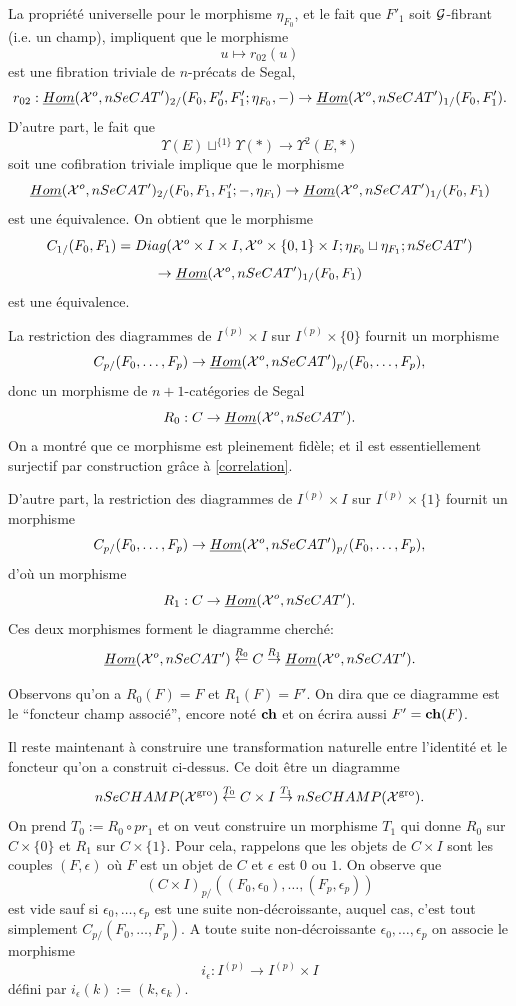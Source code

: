 \documentclass[12pt]{article}
\newcommand{\Gg}{{\cal G}}
\newcommand{\Xx}{{\cal X}}
\begin{document}
La propri\'et\'e universelle pour le morphisme $\eta _{F_0}$, et le fait que
$F'_1$ soit $\Gg$-fibrant (i.e. un champ), impliquent que
le morphisme
$$
u\mapsto r_{02}(u)
$$
est une fibration triviale de $n$-pr\'ecats de Segal,
$$
r_{02}: \underline{Hom}(\Xx ^o,nSeCAT')_{2/}(F_0, F'_0, F'_1; \eta _{F_0},-)
\rightarrow \underline{Hom}(\Xx ^o,nSeCAT')_{1/}(F_0,  F'_1).
$$
D'autre part, le fait que
$$
\Upsilon (E)\sqcup ^{\{ 1\} }\Upsilon (\ast )
\rightarrow \Upsilon ^2(E,\ast )
$$
soit une cofibration triviale implique que le morphisme
$$
\underline{Hom}(\Xx ^o,nSeCAT')_{2/}(F_0, F_1, F'_1; -,\eta _{F_1})
\rightarrow
\underline{Hom}(\Xx ^o,nSeCAT')_{1/}(F_0, F_1)
$$
est une \'equivalence. On obtient que le morphisme
$$
C_{1/}(F_0,F_1)=
Diag(\Xx ^o\times I\times I, \Xx ^o \times \{ 0,1\}\times I; \eta _{F_0}\sqcup
\eta _{F_1}; nSeCAT')
$$
$$
\rightarrow \underline{Hom}(\Xx ^o,nSeCAT')_{1/}(F_0,F_1)
$$
est une \'equivalence.

La restriction des diagrammes de $I^{(p)}\times I$ sur
$I^{(p)}\times \{ 0\}$ fournit un morphisme
$$
C_{p/}(F_0,\ldots , F_p)\rightarrow\underline{Hom}(\Xx
^o,nSeCAT')_{p/}(F_0,\ldots , F_p),
$$
donc un morphisme de $n+1$-cat\'egories de Segal
$$
R_0: C\rightarrow \underline{Hom}(\Xx ^o,nSeCAT').
$$
On  a montr\'e que ce morphisme est pleinement fid\`ele;
et il est essentiellement surjectif par construction gr\^ace \`a
\ref{correlation}.

D'autre part,  la restriction des diagrammes de $I^{(p)}\times I$ sur
$I^{(p)}\times \{ 1\}$ fournit un morphisme
$$
C_{p/}(F_0,\ldots , F_p)\rightarrow\underline{Hom}(\Xx
^o,nSeCAT')_{p/}(F_0,\ldots , F_p),
$$
d'o\`u un morphisme
$$
R_1: C\rightarrow \underline{Hom}(\Xx ^o,nSeCAT').
$$
Ces deux morphismes forment le diagramme cherch\'e:
$$
\underline{Hom}(\Xx ^o,nSeCAT')
\stackrel{R_0}{\leftarrow}C
\stackrel{R_1}{\rightarrow}\underline{Hom}(\Xx ^o,nSeCAT').
$$


Observons qu'on a $R_0(F)=F$ et $R_1(F)=F'$.
On dira que ce diagramme est le ``foncteur champ associ\'e'',
encore not\'e ${\bf ch}$
et on \'ecrira aussi $F'= {\bf ch}(F)$.


Il reste maintenant \`a construire une transformation naturelle
entre l'identit\'e et le foncteur qu'on a construit ci-dessus. Ce
doit \^etre un diagramme
$$
nSeCHAMP(\Xx ^{\rm gro})\stackrel{T_0}{\leftarrow} C\times I
\stackrel{T_1}{\rightarrow}
nSeCHAMP(\Xx ^{\rm gro}).
$$
On prend $T_0:= R_0\circ pr_1$ et on veut construire un morphisme $T_1$
qui donne $R_0$ sur $C\times \{ 0\}$ et $R_1$ sur $C\times \{ 1\}$.
Pour cela,
rappelons que les objets de $C\times I$ sont les couples $(F,\epsilon
)$ o\`u $F$ est un objet de $C$ et $\epsilon$ est $0$ ou $1$. On
observe que
$$
(C\times I)_{p/}((F_0,\epsilon _0),\ldots , (F_p, \epsilon _p))
$$
est vide sauf si $\epsilon _0,\ldots , \epsilon _p$ est une suite
non-d\'ecroissante, auquel cas, c'est tout simplement
$C_{p/}(F_0,\ldots , F_p)$. A toute suite non-d\'ecroissante $\epsilon
_0,\ldots , \epsilon _p$ on associe le morphisme
$$
i_{\epsilon} :I^{(p)}\rightarrow I^{(p)}\times I
$$
d\'efini par $ i_{\epsilon}(k):= (k, \epsilon _k)$.
\end{document}
